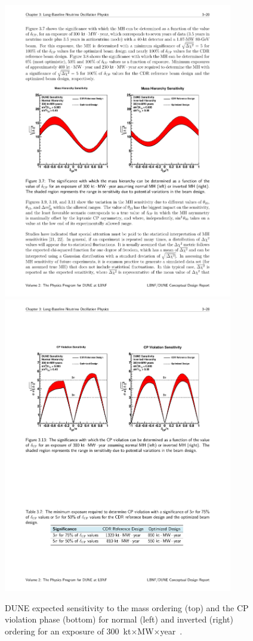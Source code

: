 \begin{figure} [htbp!]
\begin{center}
\includegraphics[width=10cm]{figures/dune_MO_sensi.pdf}
\includegraphics[width=10cm]{figures/dune_CP_sensi.pdf}
\caption{\label{fig:dunesensi} DUNE expected sensitivity to the mass ordering (top) and the CP violation phase (bottom) for normal (left) and inverted (right) ordering for an exposure of 300~kt$\times$MW$\times$year~\cite{Acciarri:2015uup}.}
\end{center}
\end{figure}



